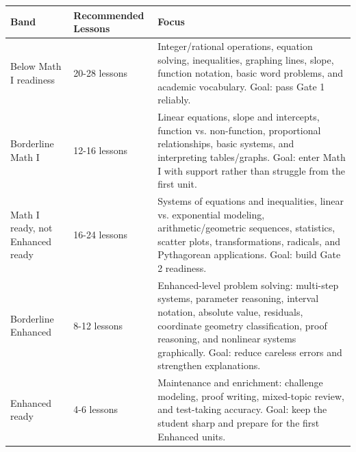 \documentclass[11pt]{article}
\renewcommand{\arraystretch}{1.18}
\begin{document}
\begin{center}
\renewcommand{\arraystretch}{1.25}
\begin{tabular}{|L{3.0cm}|L{3.8cm}|L{6.6cm}|}
\hline
\textbf{Band} & \textbf{Recommended Lessons} & \textbf{Focus}\\
\hline
Below Math I readiness & 20-28 lessons & Integer/rational operations, equation solving, inequalities, graphing lines, slope, function notation, basic word problems, and academic vocabulary. Goal: pass Gate 1 reliably.\\
\hline
Borderline Math I & 12-16 lessons & Linear equations, slope and intercepts, function vs. non-function, proportional relationships, basic systems, and interpreting tables/graphs. Goal: enter Math I with support rather than struggle from the first unit.\\
\hline
Math I ready, not Enhanced ready & 16-24 lessons & Systems of equations and inequalities, linear vs. exponential modeling, arithmetic/geometric sequences, statistics, scatter plots, transformations, radicals, and Pythagorean applications. Goal: build Gate 2 readiness.\\
\hline
Borderline Enhanced & 8-12 lessons & Enhanced-level problem solving: multi-step systems, parameter reasoning, interval notation, absolute value, residuals, coordinate geometry classification, proof reasoning, and nonlinear systems graphically. Goal: reduce careless errors and strengthen explanations.\\
\hline
Enhanced ready & 4-6 lessons & Maintenance and enrichment: challenge modeling, proof writing, mixed-topic review, and test-taking accuracy. Goal: keep the student sharp and prepare for the first Enhanced units.\\
\hline
\end{tabular}
\end{center}
\end{document}

